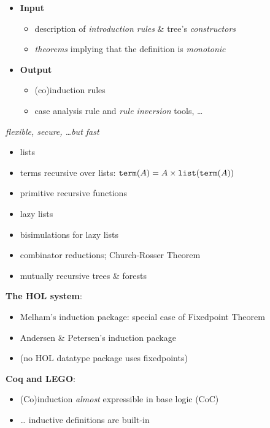 \begin{slide}
\centering
\begin{itemize}
  \item {\bf Input} 
     \begin{itemize}
      \item description of {\it introduction rules\/} \& tree's {\it
          constructors\/} 
      \item {\it theorems\/} implying that the definition is {\it monotonic\/}
    \end{itemize}
  \item {\bf Output} 
     \begin{itemize}
      \item (co)induction rules
      \item case analysis rule and {\it rule inversion\/} tools, \ldots
    \end{itemize}
\end{itemize}

\vfill
{\it flexible, secure, \ldots but fast\/}
\end{slide}


\begin{slide}
\begin{itemize}
  \item lists
  \item terms recursive over lists: $\hbox{\tt term}(A) = A\times\hbox{\tt list}(\hbox{\tt term}(A))$
  \item primitive recursive functions
  \item lazy lists
  \item bisimulations for lazy lists
  \item combinator reductions; Church-Rosser Theorem
  \item mutually recursive trees \& forests
\end{itemize}
\end{slide}


\begin{slide}
{\bf The HOL system}:
\begin{itemize}
  \item Melham's induction package: special case of Fixedpoint Theorem
  \item Andersen \& Petersen's induction package
  \item (no HOL datatype package uses fixedpoints)
\end{itemize}

{\bf Coq and LEGO}:
\begin{itemize}
  \item (Co)induction {\it almost\/} expressible in base logic (CoC)
  \item \ldots{} inductive definitions are built-in
\end{itemize}
\end{slide}


